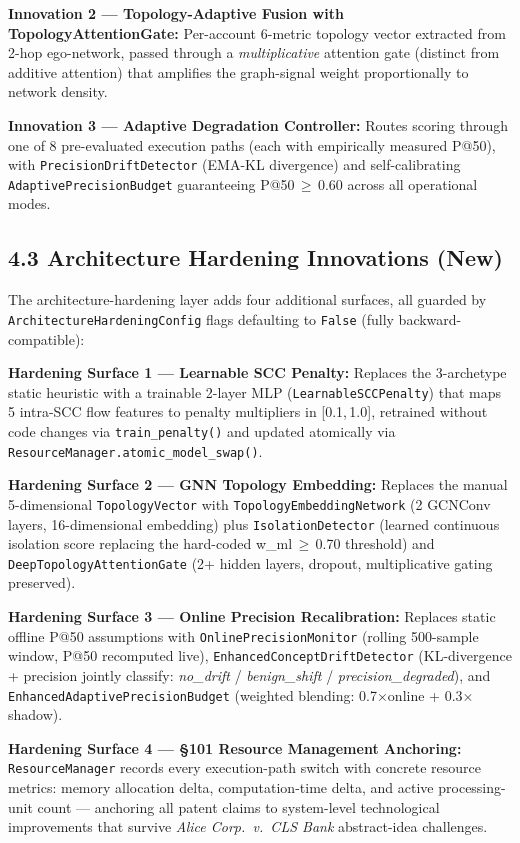 \documentclass[12pt,a4paper]{article}
\begin{document}
\textbf{Innovation 2 --- Topology-Adaptive Fusion with TopologyAttentionGate:}
Per-account 6-metric topology vector extracted from 2-hop ego-network, passed through a
\emph{multiplicative} attention gate (distinct from additive attention) that amplifies
the graph-signal weight proportionally to network density.

\textbf{Innovation 3 --- Adaptive Degradation Controller:} Routes scoring through one of 8
pre-evaluated execution paths (each with empirically measured P@50), with
\texttt{PrecisionDriftDetector} (EMA-KL divergence) and self-calibrating
\texttt{AdaptivePrecisionBudget} guaranteeing P@50\,$\geq$\,0.60 across all operational modes.

\subsection{4.3 Architecture Hardening Innovations (New)}

The architecture-hardening layer adds four additional surfaces, all guarded by
\texttt{ArchitectureHardeningConfig} flags defaulting to \texttt{False} (fully backward-compatible):

\textbf{Hardening Surface 1 --- Learnable SCC Penalty:} Replaces the 3-archetype static
heuristic with a trainable 2-layer MLP (\texttt{LearnableSCCPenalty}) that maps 5 intra-SCC
flow features to penalty multipliers in [0.1,\,1.0], retrained without code changes via
\texttt{train\_penalty()} and updated atomically via \texttt{ResourceManager.atomic\_model\_swap()}.

\textbf{Hardening Surface 2 --- GNN Topology Embedding:} Replaces the manual 5-dimensional
\texttt{TopologyVector} with \texttt{TopologyEmbeddingNetwork} (2 GCNConv layers, 16-dimensional
embedding) plus \texttt{IsolationDetector} (learned continuous isolation score replacing the
hard-coded w\_ml\,$\geq$\,0.70 threshold) and \texttt{DeepTopologyAttentionGate}
(2+ hidden layers, dropout, multiplicative gating preserved).

\textbf{Hardening Surface 3 --- Online Precision Recalibration:} Replaces static offline
P@50 assumptions with \texttt{OnlinePrecisionMonitor} (rolling 500-sample window, P@50
recomputed live), \texttt{EnhancedConceptDriftDetector} (KL-divergence + precision jointly
classify: \textit{no\_drift} / \textit{benign\_shift} / \textit{precision\_degraded}), and
\texttt{EnhancedAdaptivePrecisionBudget} (weighted blending: 0.7$\times$online + 0.3$\times$shadow).

\textbf{Hardening Surface 4 --- \S101 Resource Management Anchoring:}
\texttt{ResourceManager} records every execution-path switch with concrete resource metrics:
memory allocation delta, computation-time delta, and active processing-unit count ---
anchoring all patent claims to system-level technological improvements that survive
\textit{Alice Corp.\ v.\ CLS Bank} abstract-idea challenges.
\end{document}
